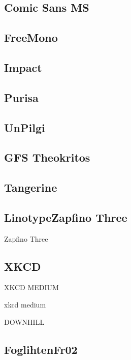 \documentclass[12pt]{article}
\begin{document}
\subsection*{Comic Sans MS}
\lipsum[1]

\subsection*{FreeMono}
\lipsum[1]

\subsection*{Impact}
\lipsum[1]

\subsection*{Purisa}
\lipsum[1]

\subsection*{UnPilgi}
\lipsum[1]

\subsection*{GFS Theokritos}
\lipsum[1]

\subsection*{Tangerine}
\lipsum[1]

\subsection*{LinotypeZapfino Three}
\lipsum[1]

Zapfino Three

\subsection*{XKCD}


XKCD MEDIUM

xkcd medium

DOWNHILL

\lipsum[1]


\subsection*{FoglihtenFr02}
\end{document}
